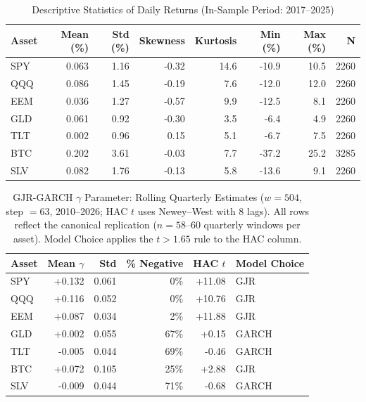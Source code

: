 
\begin{table}[H]
\centering
\caption{Descriptive Statistics of Daily Returns (In-Sample Period: 2017--2025)}
\label{tab:desc}
\begin{tabular}{lrrrrrrr}
\toprule
Asset & Mean (\%) & Std (\%) & Skewness & Kurtosis & Min (\%) & Max (\%) & N \\
\midrule
SPY & 0.063 & 1.16 & -0.32 & 14.6 & -10.9 & 10.5 & 2260 \\
QQQ & 0.086 & 1.45 & -0.19 & 7.6 & -12.0 & 12.0 & 2260 \\
EEM & 0.036 & 1.27 & -0.57 & 9.9 & -12.5 & 8.1 & 2260 \\
GLD & 0.061 & 0.92 & -0.30 & 3.5 & -6.4 & 4.9 & 2260 \\
TLT & 0.002 & 0.96 & 0.15 & 5.1 & -6.7 & 7.5 & 2260 \\
BTC & 0.202 & 3.61 & -0.03 & 7.7 & -37.2 & 25.2 & 3285 \\
SLV & 0.082 & 1.76 & -0.13 & 5.8 & -13.6 & 9.1 & 2260 \\
\bottomrule
\end{tabular}
\end{table}

\begin{table}[H]
\centering
\caption{GJR-GARCH $\gamma$ Parameter: Rolling Quarterly Estimates ($w = 504$, step $= 63$, 2010--2026; HAC $t$ uses Newey--West with 8 lags). All rows reflect the canonical replication ($n = 58$--$60$ quarterly windows per asset). Model Choice applies the $t > 1.65$ rule to the HAC column.}
\label{tab:gamma}
\begin{tabular}{lrrrrl}
\toprule
Asset & Mean $\gamma$ & Std & \% Negative & HAC $t$ & Model Choice \\
\midrule
SPY & +0.132 & 0.061 & 0\% & +11.08 & GJR \\
QQQ & +0.116 & 0.052 & 0\% & +10.76 & GJR \\
EEM & +0.087 & 0.034 & 2\% & +11.88 & GJR \\
GLD & +0.002 & 0.055 & 67\% & +0.15 & GARCH \\
TLT & -0.005 & 0.044 & 69\% & -0.46 & GARCH \\
BTC & +0.072 & 0.105 & 25\% & +2.88 & GJR \\
SLV & -0.009 & 0.044 & 71\% & -0.68 & GARCH \\
\bottomrule
\end{tabular}
\end{table}

